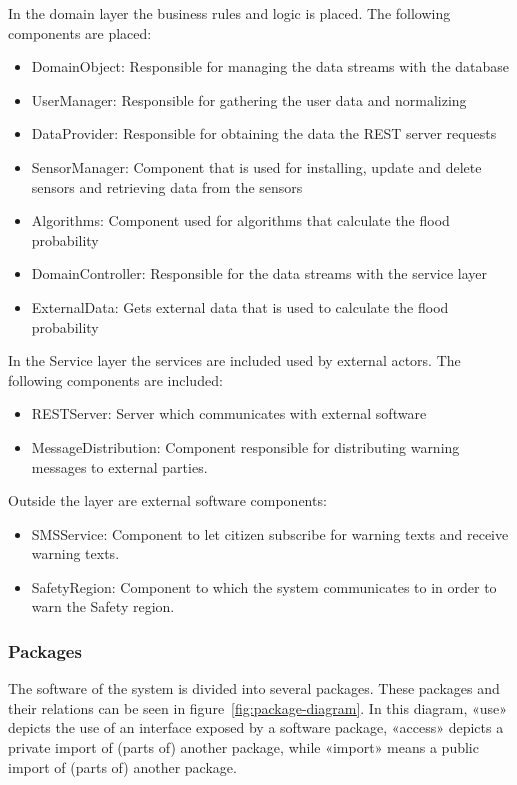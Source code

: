 In the domain layer the business rules and logic is placed. The following components are placed:
\begin{itemize}
	\item DomainObject: Responsible for managing the data streams with the database
	\item UserManager: Responsible for gathering the user data and normalizing
	\item DataProvider: Responsible for obtaining the data the REST server requests
	\item SensorManager: Component that is used for installing, update and delete sensors and retrieving data from the sensors
	\item Algorithms: Component used for algorithms that calculate the flood probability
	\item DomainController: Responsible for the data streams with the service layer
	\item ExternalData: Gets external data that is used to calculate the flood probability
\end{itemize}

In the Service layer the services are included used by external actors. The following components are included:
\begin{itemize}
	\item RESTServer: Server which communicates with external software
	\item MessageDistribution: Component responsible for distributing warning messages to external parties.
	\end{itemize}
	
Outside the layer are external software components:
\begin{itemize}
	\item SMSService: Component to let citizen subscribe for warning texts and receive warning texts.
	\item SafetyRegion: Component to which the system communicates to in order to warn the Safety region.
	\end{itemize}


\subsubsection{Packages}
The software of the system is divided into several packages. These packages and their relations can be seen in figure~\ref{fig:package-diagram}. 
In this diagram, «use» depicts the use of an interface exposed by a software package, «access» depicts a private import of (parts of) another package, while «import» means a public import of (parts of) another package. 

